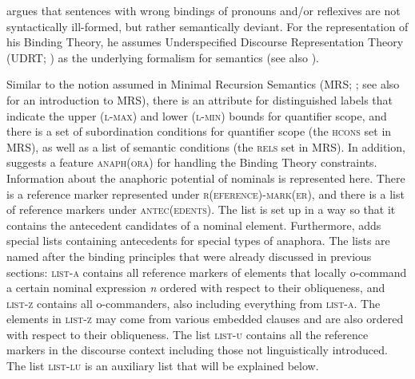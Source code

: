 \documentclass[output=paper,biblatex,babelshorthands,newtxmath,draftmode,colorlinks,citecolor=brown]{langscibook}
\begin{document}
\citet{Branco2002a} argues that sentences with wrong bindings of pronouns and/or reflexives are not
syntactically ill-formed, but rather semantically deviant. For the representation of his Binding Theory, he
assumes Underspecified Discourse Representation Theory (UDRT; \citealp{Reyle93b-u,FR95a-u}) as the
underlying formalism for semantics (see also
). 

Similar to the notion assumed in Minimal Recursion Semantics (MRS; \citealp*{CFPS2005a}; see also  for an introduction to MRS), there is an
attribute for distinguished labels that indicate the upper (\textsc{l-max}) and lower
(\textsc{l-min}) bounds for quantifier scope, and there is a set of subordination conditions for
quantifier scope (the \textsc{hcons} set in MRS), as well as a list of semantic conditions (the \textsc{rels}
set in MRS). In addition, \citeauthor{Branco2002a} suggests a feature \textsc{anaph(ora)} for handling
the Binding Theory constraints. Information about the anaphoric potential of nominals is represented
here. There is a reference marker represented under \textsc{r(eference)-mark(er)}, and there is a list
of reference markers under \textsc{antec(edents)}. The list is set up in a way so that it contains
the antecedent candidates of a nominal element. Furthermore, \citeauthor{Branco2002a} adds special
lists containing antecedents for special types of anaphora. The lists are named after the binding
principles that were already discussed in previous sections: \textsc{list-a} contains all reference
markers of elements that locally o-command a certain nominal expression \emph{n} ordered with
respect to their obliqueness, and \textsc{list-z} contains all o-commanders, also including everything
from \textsc{list-a}. The elements in \textsc{list-z} may come from various
embedded clauses and are also ordered with respect to their obliqueness. The list \textsc{list-u}
contains all the reference markers in the discourse context including those not linguistically
introduced. The list \textsc{list-lu} is an auxiliary list that will be explained below.
\ea
{}
\z
\end{document}
